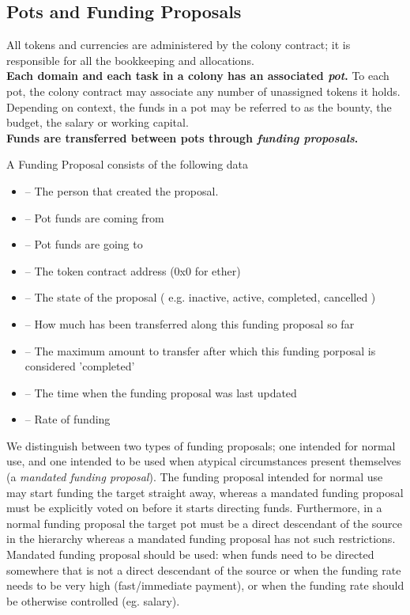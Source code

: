 \subsection{Pots and Funding Proposals}\label{sec:pots-and-fp}
All tokens and currencies are administered by the colony contract; it is responsible for all the bookkeeping and allocations.\\
\textbf{Each domain and each task in a colony has an associated \emph{pot}.} To each pot, the colony contract may associate any number of unassigned tokens it holds. Depending on context, the funds in a pot may be referred to as the bounty, the budget, the salary or working capital.\\
\textbf{Funds are transferred between pots through \emph{funding proposals}.}
\begin{description}
 \item A Funding Proposal consists of the following data
 \begin{itemize}
  \item {}	--	The person that created the proposal.
  \item {}	--	Pot funds are coming from
  \item {}	--	Pot funds are going to
  \item {}	--	The token contract address (0x0 for ether)
  \item {}	--	The state of the proposal ( e.g. inactive, active, completed, cancelled )
  \item {}	--	How much has been transferred along this funding proposal so far
  \item {}	--	The maximum amount to transfer after which this funding porposal is considered 'completed'
  \item {}	--	The time when the funding proposal was last updated
  \item {}	--	Rate of funding
 \end{itemize}

\end{description}
We distinguish between two types of funding proposals; one intended for normal use, and one intended to be used when atypical circumstances present themselves (a \emph{mandated funding proposal}). The funding proposal intended for normal use may start funding the target straight away, whereas a mandated funding proposal must be explicitly voted on before it starts directing funds. Furthermore, in a normal funding proposal the target pot must be a direct descendant of the source in the hierarchy whereas a mandated funding proposal has not such restrictions.\\
Mandated funding proposal should be used: when funds need to be directed somewhere that is not a direct descendant of the source or when the funding rate needs to be very high (fast/immediate payment), or when the funding rate should be otherwise controlled (eg. salary).\\

